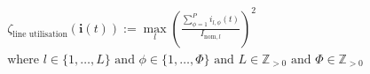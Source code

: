 \begin{equation}
\begin{split}
	\zeta_\text{line utilisation}(\textbf{i}(t)) :=
	\max_{l}{\left(\frac{\sum_{\phi=1}^{P}{i_{l,\phi}(t)}}{I_{\text{nom},l}}\right)^2} \\
	\text{where } l \in \{1, \dots, L\} \text{ and } \phi \in \{1, \dots, \Phi\} \text{ and } L \in \mathbb{Z}_{>0} \text{ and } \Phi \in \mathbb{Z}_{>0}
\end{split}
\label{ch1:equ:line-utilisation}
\end{equation}